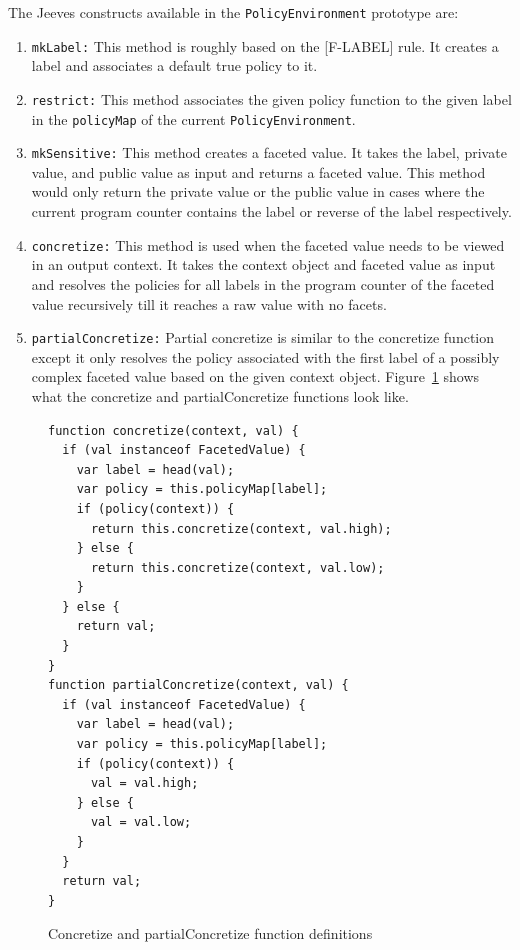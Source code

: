 The Jeeves constructs available in the \texttt{PolicyEnvironment} prototype are:
\begin{enumerate}
  \item \texttt{mkLabel:} This method is roughly based on the [F-LABEL] rule. It
    creates a label and associates a default true policy to it.
  \item \texttt{restrict:} This method associates the given policy function to the
  given label in the \texttt{policyMap} of the current \texttt{PolicyEnvironment}.
  \item \texttt{mkSensitive:} This method creates a faceted value. It takes the
  label, private value, and public value as input and returns a faceted value. This
  method would only return the private value or the public value in cases where
  the current program counter contains the label or reverse of the label respectively.
  \item \texttt{concretize:} This method is used when the faceted value needs to
  be viewed in an output context. It takes the context object and faceted value
  as input and resolves the policies for all labels in the program counter of
  the faceted value recursively till it reaches a raw value with no facets.
  \item \texttt{partialConcretize:} Partial concretize is similar to the concretize
  function except it only resolves the policy associated with the first label of
  a possibly complex faceted value based on the given context object.
  Figure~\ref{fig:concretize} shows what the concretize and partialConcretize
  functions look like.
\end{enumerate}

\begin{figure}
  \begin{lstlisting}
function concretize(context, val) {
  if (val instanceof FacetedValue) {
    var label = head(val);
    var policy = this.policyMap[label];
    if (policy(context)) {
      return this.concretize(context, val.high);
    } else {
      return this.concretize(context, val.low);
    }
  } else {
    return val;
  }
}
function partialConcretize(context, val) {
  if (val instanceof FacetedValue) {
    var label = head(val);
    var policy = this.policyMap[label];
    if (policy(context)) {
      val = val.high;
    } else {
      val = val.low;
    }
  }
  return val;
}
  \end{lstlisting}
  \caption{Concretize and partialConcretize function definitions}
  \label{fig:concretize}
\end{figure}

